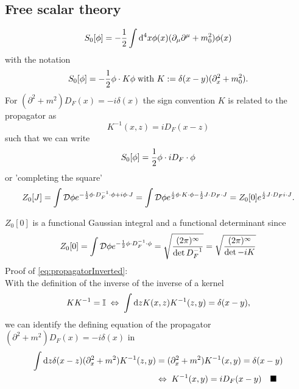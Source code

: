 \subsection{Free scalar theory}
\begin{mybox}{}
\begin{equation}
	S_0[\phi] = - \frac{1}{2} \int \mathrm{d}^4 x \phi(x) (\partial_\mu \partial^\mu+m^2_0)\phi(x)
\end{equation}
with the notation
\begin{equation*}
	S_0[\phi] = -\frac{1}{2} \phi \cdot K\phi \; \text{with } K:= \delta(x-y) (\partial^2_x+m^2_0).
\end{equation*}
For $(\partial^2+m^2)D_F(x)=-i \delta(x)$ the sign convention $K$ is related to the propagator as
\begin{equation}
\label{eq:propagatorInverted}
	K^{-1}(x,z)=iD_F(x-z)
\end{equation}
such that we can write
\begin{equation}
	S_0[\phi] = \frac{1}{2} \phi\cdot iD_F\cdot \phi
\end{equation}
or ’completing the square’
\begin{equation}
	Z_0[J] = \int \mathcal{D}\phi e^{- \frac{1}{2} \phi \cdot D^{-1}_F\cdot \phi + i\phi \cdot J} = \int \mathcal{D}\phi e^{\frac{i}{2} \phi \cdot K \cdot \phi-\frac{1}{2} J\cdot D_F \cdot J} = Z_0[0] e^{\frac{i}{2} J\cdot D_F i\cdot J}.
\end{equation}

\end{mybox}
$Z_0[0]$ is a functional Gaussian integral and a functional determinant since
\begin{equation}
	Z_0[0] = \int \mathcal{D}\phi e^{-\frac{1}{2} \phi\cdot D^{-1}_F\cdot \phi} = \sqrt{\frac{(2 \pi)^\infty}{\det D^{-1}_F}} = \sqrt{\frac{(2 \pi)^\infty}{\det -iK}}
\end{equation}
Proof of \ref{eq:propagatorInverted}:\\
With the definition of the inverse of the inverse of a kernel
\begin{equation*}
	KK^{-1} = \mathbb{I} \; \Leftrightarrow \; \int \mathrm{d} z K(x,z) K^{-1}(z,y) = \delta(x-y),
\end{equation*}
we can identify the defining equation of the propagator $(\partial^2+m^2)D_F(x) = -i \delta(x)$ in
\begin{align*}
	\int \mathrm{d} z \delta(x-z) (\partial^2_x+m^2) K^{-1}(z,y) &= (\partial^2_x +m^2) K^{-1}(x,y) = \delta(x-y) \\
	&\Leftrightarrow\; K^{-1}(x,y) = i D_F(x-y) \quad \blacksquare
\end{align*}













